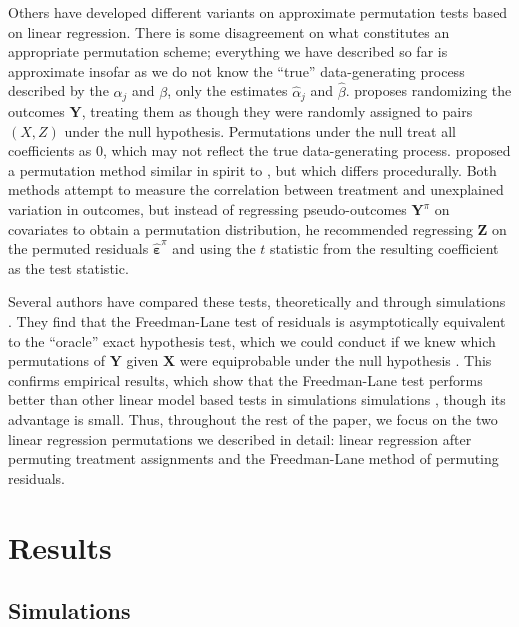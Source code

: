 \documentclass[11pt]{article}
\begin{document}
Others have developed different variants on approximate permutation tests based on linear regression. 
There is some disagreement on what constitutes an appropriate permutation scheme;
everything we have described so far is approximate insofar as we do not know the ``true'' data-generating process described by the $\alpha_j$ and $\beta$,
only the estimates $\hat{\alpha}_j$ and $\hat{\beta}$.
\cite{manly_randomization_2006} proposes randomizing the outcomes $\mathbf{Y}$, treating them as though they were randomly assigned to pairs $(X, Z)$ under the null hypothesis.
Permutations under the null treat all coefficients as 0, which may not reflect the true data-generating process.
\cite{kennedy_randomization_1995} proposed a permutation method similar in spirit to \cite{freedman_nonstochastic_1983}, but which differs procedurally.
Both methods attempt to measure the correlation between treatment and unexplained variation in outcomes, but
instead of regressing pseudo-outcomes $\mathbf{Y}^\pi$ on covariates to obtain a permutation distribution, he recommended regressing $\mathbf{Z}$ on the permuted residuals $\mathbf{\hat{\varepsilon}}^\pi$ and using the $t$ statistic from the resulting coefficient as the test statistic. 

Several authors have compared these tests, theoretically and through simulations \cite{anderson_empirical_1999, anderson_permutation_2001, kennedy_randomization_1996}.
They find that the Freedman-Lane test of residuals is asymptotically equivalent to the ``oracle'' exact hypothesis test, which we could conduct if we knew which permutations of $\mathbf{Y}$ given $\mathbf{X}$ were equiprobable under the null hypothesis \cite{anderson_permutation_2001}.
This confirms empirical results, which show that the Freedman-Lane test performs better than other linear model based tests in simulations simulations \cite{anderson_empirical_1999}, though its advantage is small.
Thus, throughout the rest of the paper, we focus on the two linear regression permutations we described in detail: linear regression after permuting treatment assignments and the Freedman-Lane method of permuting residuals.


\section*{Results}
\subsection*{Simulations}\label{simulations}
\end{document}
